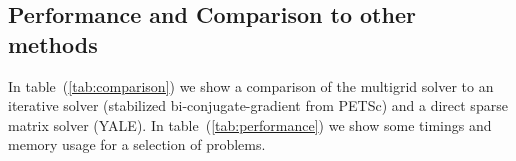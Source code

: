 \documentclass{article}
\begin{document}
%

\subsection{Performance and Comparison to other methods}
In table~(\ref{tab:comparison}) we show a comparison of the multigrid solver to an iterative
solver (stabilized bi-conjugate-gradient from PETSc) and a direct sparse matrix solver (YALE). 
In table~(\ref{tab:performance}) we show some timings and memory usage for a selection of
problems.










\printindex
\end{document}
